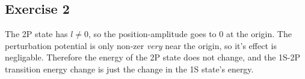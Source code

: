 \documentclass[12pt]{article}
\begin{document}
\subsection*{Exercise 2}
The 2P state has $l\neq 0$, so the position-amplitude goes to 0 at the origin. The perturbation potential is only non-zer \textit{very} near the origin, so it's effect is negligable. Therefore the energy of the 2P state does not change, and the 1S-2P transition energy change is just the change in the 1S state's energy.
\end{document}
